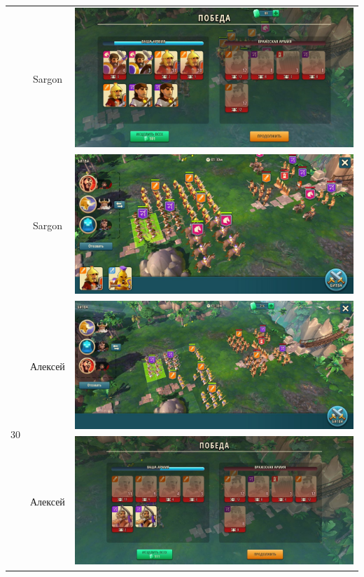 \begin{longtable}{|c|c|c|}
    & Sargon &
    \includegraphics[width=0.75\linewidth]{./parts/media/TreasureHunt/30/sargon/photo_2022-04-07_10-05-04.jpg} \\
    & Sargon &
    \includegraphics[width=0.75\linewidth]{./parts/media/TreasureHunt/30/sargon/photo_2022-04-07_10-04-47.jpg} \\
    \hline
    \multirow{10}{*}{30} & Алексей &
    \includegraphics[width=0.75\linewidth]{./parts/media/TreasureHunt/30/alexey/photo_2022-04-07_14-26-42.jpg} \\
    & Алексей &
    \includegraphics[width=0.75\linewidth]{./parts/media/TreasureHunt/30/alexey/photo_2022-04-07_14-26-46.jpg} \\

\end{longtable}

